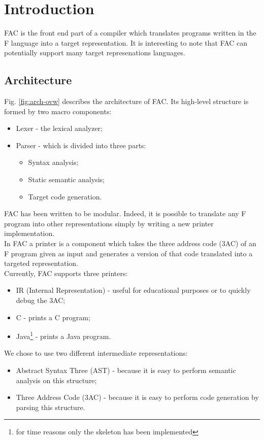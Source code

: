 \section*{Introduction}

FAC is the front end part of a compiler which translates programs written in the
F language into a target representation. It is interesting to note that FAC can
potentially support many target represenations languages.

\subsection*{Architecture}
Fig. \ref{fig:arch-ovw} describes the architecture of FAC.
Its high-level structure is formed by two macro components:
\begin{itemize}
\item Lexer - the lexical analyzer;
\item Parser - which is divided into three parts:
\begin{itemize}
	\item Syntax analysis;
	\item Static semantic analysis;
	\item Target code generation.
\end{itemize}
\end{itemize}

FAC has been written to be modular. Indeed, it is possible to translate any F
program into other representations simply by writing a new printer implementation.
\\
In FAC a printer is a component which takes the three address code (3AC) of an F
program given as input and generates a version of that code translated into a targeted
representation.
\\
Currently, FAC supports three printers:
\begin{itemize}
\item IR (Internal Representation) - useful for educational purposes or to quickly debug the 3AC;
\item C - prints a C program;
\item Java\footnote{for time reasons only the skeleton has been implemented} - prints a Java program.
\end{itemize}

We chose to use two different intermediate representations:
\begin{itemize}
\item Abstract Syntax Three (AST) - because it is easy to perform semantic analysis on this structure;
\item Three Address Code (3AC) - because it is easy to perform code generation by parsing this structure.
\end{itemize}


